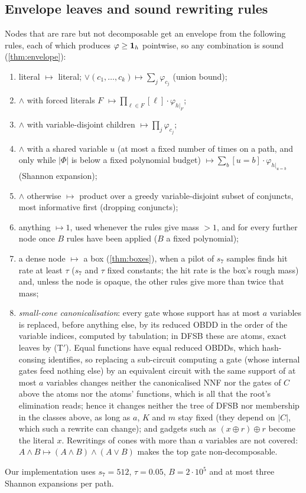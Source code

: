 \subsection{Envelope leaves and sound rewriting rules}\label{sec:rules}

Nodes that are rare but not decomposable get an envelope from the following
rules, each of which produces $\varphi\ge\mathbf{1}_h$ pointwise, so any combination is
sound (\cref{thm:envelope}):
\begin{enumerate}[label=(R\arabic*)]
\item literal $\mapsto$ literal; $\vee(c_1,\dots,c_k)\mapsto\sum_j\varphi_{c_j}$ (union bound);
\item $\wedge$ with forced literals $F$ $\mapsto\prod_{\ell\in F}[\ell]\cdot\varphi_{h|_F}$;
\item $\wedge$ with variable-disjoint children $\mapsto\prod_j\varphi_{c_j}$;
\item $\wedge$ with a shared variable $u$ (at most a fixed number of times on a
path, and only while $|\Phi|$ is below a fixed polynomial budget)
$\mapsto\sum_b[u=b]\cdot\varphi_{h|_{u=b}}$ (Shannon expansion);
\item $\wedge$ otherwise $\mapsto$ product over a greedy variable-disjoint subset of
conjuncts, most informative first (dropping conjuncts);
\item anything $\mapsto1$, used whenever the rules give mass $>1$, and for every
further node once $B$ rules have been applied ($B$ a fixed polynomial);
\item a dense node $\mapsto$ a box (\cref{thm:boxes}), when a pilot of $s_7$
samples finds hit rate at least $\tau$ ($s_7$ and $\tau$ fixed constants; the hit rate
is the box's rough mass) and, unless the node is opaque, the other rules give more
than twice that mass;
\item \emph{small-cone canonicalisation}: every gate whose support has at most
$a$ variables is replaced, before anything else, by its reduced OBDD in the order
of the variable indices, computed by tabulation; in DFSB these are atoms, exact
leaves by (T$'$). Equal functions have equal reduced OBDDs, which hash-consing
identifies, so replacing a sub-circuit computing a gate (whose internal gates feed
nothing else) by an equivalent circuit with the same support of at most $a$
variables changes neither the canonicalised NNF nor the gates of $C$ above the atoms
nor the atoms' functions, which is all that the root's elimination reads; hence it
changes neither the tree of DFSB nor membership in the classes above, as long as
$a$, $K$ and $m$ stay fixed (they depend on $|C|$, which such a rewrite can change); and gadgets such as $(x\oplus r)\oplus r$
become the literal $x$. Rewritings of cones with more than $a$ variables are not covered:
$A\wedge B\mapsto(A\wedge B)\wedge(A\vee B)$ makes the top gate non-decomposable.
\end{enumerate}
Our implementation uses $s_7=512$, $\tau=0.05$, $B=2\cdot10^5$ and at most three
Shannon expansions per path.

